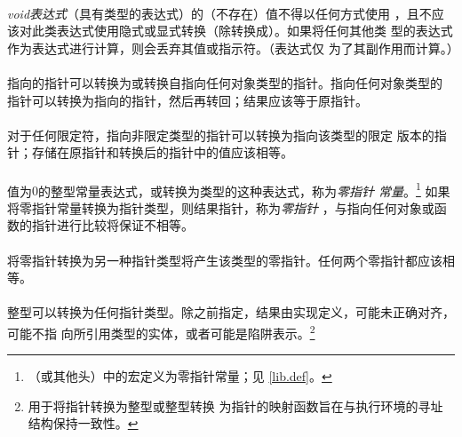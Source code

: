 {

\paragraph{}
\textit{void表达式}（具有类型的表达式）的（不存在）值不得以任何方式使用
，且不应该对此类表达式使用隐式或显式转换（除转换成）。如果将任何其他类
型的表达式作为表达式进行计算，则会丢弃其值或指示符。（表达式仅
为了其副作用而计算。）

\paragraph{}
指向的指针可以转换为或转换自指向任何对象类型的指针。指向任何对象类型的
指针可以转换为指向的指针，然后再转回；结果应该等于原指针。

\paragraph{}
对于任何限定符，指向非限定类型的指针可以转换为指向该类型的限定
版本的指针；存储在原指针和转换后的指针中的值应该相等。

\paragraph{}
值为$0$的整型常量表达式，或转换为类型的这种表达式，称为\textit{零指针
常量}。\footnote{（或其他头）中的宏定义为零指针常量；见
\ref{lib.def}。} 如果将零指针常量转换为指针类型，则结果指针，称为\textit{零指针}
，与指向任何对象或函数的指针进行比较将保证不相等。

\paragraph{}
将零指针转换为另一种指针类型将产生该类型的零指针。任何两个零指针都应该相等。

\paragraph{}
整型可以转换为任何指针类型。除之前指定，结果由实现定义，可能未正确对齐，可能不指
向所引用类型的实体，或者可能是陷阱表示。\footnote{用于将指针转换为整型或整型转换
为指针的映射函数旨在与执行环境的寻址结构保持一致性。}

}
